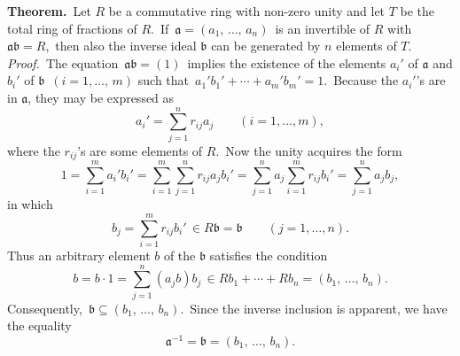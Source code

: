 \documentclass[12pt]{article}
\theoremstyle{definition}
\begin{document}
\textbf{Theorem.}\, Let $R$ be a commutative ring with non-zero 
unity and let $T$ be the total ring of fractions of $R$.\, If\, 
$\mathfrak{a} = (a_1,\,\ldots,\,a_n)$\, is an invertible 
 of $R$ with \,$\mathfrak{ab} = R$,\, then also the inverse 
ideal $\mathfrak{b}$ can be generated by $n$ elements of $T$.\\

{\em Proof.} \,The equation\, $\mathfrak{ab} = (1)$\, implies the existence of the elements $a_i'$ of $\mathfrak{a}$ and $b_i'$ of $\mathfrak{b}$\, $(i = 1, \ldots,\,m)$ such that\, $a_1'b_1'\!+\cdots+\!a_m'b_m' = 1$.\, Because the $a_i'$'s are
in $\mathfrak{a}$, they may be expressed as
            $$a_i' = \sum_{j=1}^{n}r_{ij}a_j \qquad(i = 1, \ldots, m),$$
where the $r_{ij}$'s are some elements of $R$.\, Now the unity acquires the 
form
 $$1 = \sum_{i=1}^{m}a_i'b_i' =
   \sum_{i=1}^{m}\sum_{j=1}^{n}r_{ij}a_jb_i' =
   \sum_{j=1}^{n}a_j\sum_{i=1}^{m}r_{ij}b_i' = \sum_{j=1}^{n}a_jb_j,$$
in which
  $$b_j = \sum_{i=1}^{m}r_{ij}b_i' \,\in R\mathfrak{b} = \mathfrak{b}
\qquad (j = 1, \ldots, n).$$
Thus an arbitrary element $b$ of the  $\mathfrak{b}$ satisfies the condition
 $$b = b\!\cdot\!1 = \sum_{j=1}^{n}(a_jb)b_j \, \in Rb_1\!+\cdots+\!Rb_n = (b_1,\,\ldots,\,b_n).$$
Consequently,\, $\mathfrak{b} \subseteq (b_1,\,\ldots,\,b_n)$.\, Since the inverse inclusion is apparent, we have the equality
     $$\mathfrak{a}^{-1} = \mathfrak{b} = (b_1,\,\ldots,\,b_n).$$
\end{document}
